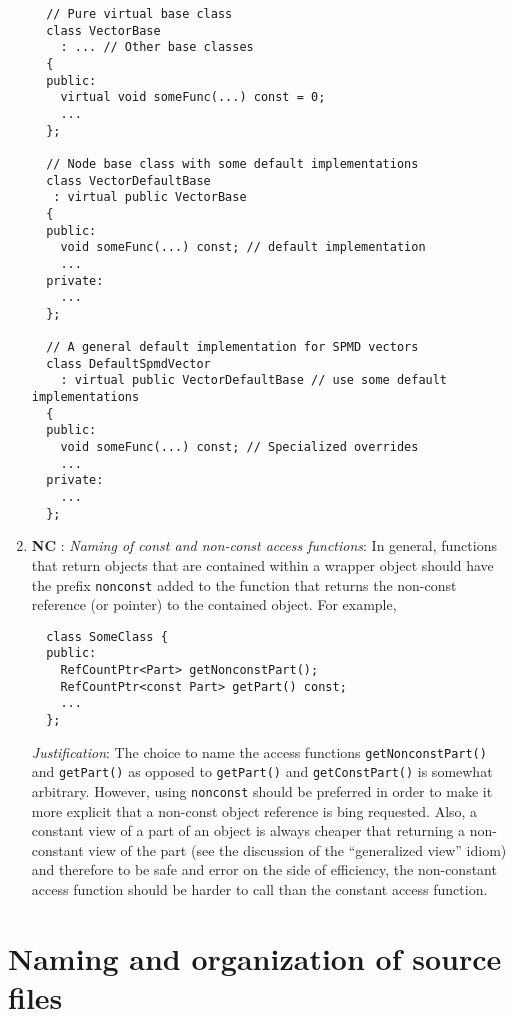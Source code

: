 \begin{enumerate}
{\small\begin{verbatim}
  // Pure virtual base class 
  class VectorBase
    : ... // Other base classes
  {
  public:
    virtual void someFunc(...) const = 0;
    ...
  };

  // Node base class with some default implementations
  class VectorDefaultBase
   : virtual public VectorBase
  {
  public:
    void someFunc(...) const; // default implementation
    ...
  private:
    ...
  };

  // A general default implementation for SPMD vectors
  class DefaultSpmdVector
    : virtual public VectorDefaultBase // use some default implementations
  {
  public:
    void someFunc(...) const; // Specialized overrides
    ...
  private:
    ...
  };
\end{verbatim}}

{}\item{}\textbf{NC }:
{}\textit{Naming of const and non-const access functions}: In general,
functions that return objects that are contained within a wrapper object
should have the prefix {}\texttt{nonconst} added to the function that returns
the non-const reference (or pointer) to the contained object.  For example,

{\small\begin{verbatim}
  class SomeClass {
  public:
    RefCountPtr<Part> getNonconstPart();
    RefCountPtr<const Part> getPart() const;
    ...
  };
\end{verbatim}}

{}\textit{Justification}: The choice to name the access functions
{}\texttt{getNonconstPart()} and {}\texttt{getPart()} as opposed to
{}\texttt{getPart()} and {}\texttt{getConstPart()} is somewhat arbitrary.
However, using {}\texttt{nonconst} should be preferred in order to make it
more explicit that a non-const object reference is bing requested.  Also, a
constant view of a part of an object is always cheaper that returning a
non-constant view of the part (see the discussion of the ``generalized view''
idiom) and therefore to be safe and error on the side of efficiency, the
non-constant access function should be harder to call than the constant access
function.

\end{enumerate}

%
\section{Naming and organization of source files}
%

